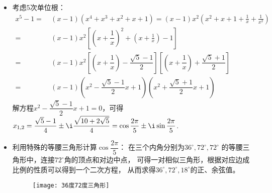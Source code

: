 \begin{itemize}[leftmargin=\inteval{\myitemleftmargin}pt,itemsep=
   \inteval{\myitemitempsep}pt,topsep=\inteval{\myitemtopsep}pt]
\item 考虑5次单位根：
\begin{align*}
    x^5-1=&\ (x-1)(x^4+x^3+x^2+x+1)=(x-1) x^2 \left(x^2+x+1+\frac{1}{x}+\frac{1}{x^2} \right)  \\
    =&\  (x-1) x^2 \left[\left( x+\dfrac{1}{x} \right)^2+ \left( x+\frac{1}{x} \right)-1  \right] \\
    =&\ (x-1) x^2\left[ \left(x+\dfrac{1}{x} \right)-\dfrac{\sqrt{5}-1}{2}  \right] 
    \left[ \left(x+\dfrac{1}{x} \right)+\dfrac{\sqrt{5}+1}{2} \right]   \\
    =&\  (x-1)\left( x^2-\dfrac{\sqrt{5}-1}{2}x+1\right) \left( x^2+\dfrac{\sqrt{5}+1}{2}x+1\right) 
\end{align*}
解方程$  x^2-\dfrac{\sqrt{5}-1}{2}x+1=0 $，可得$ x_{1,2}=\dfrac{\sqrt{5}-1}{4}
\pm \i\dfrac{\sqrt{10+2\sqrt{5}}}{4}=\cos\dfrac{2\pi}{5}\pm \i \sin \dfrac{2\pi}{5} $. 

\item 利用特殊的等腰三角形计算$ \cos\dfrac{2\pi}{5} $：
在三个内角分别为$ 36^{\circ},72^{\circ},72^{\circ}$
的等腰三角形中，连接$ 72^{\circ} $角的顶点和对边中点，
可得一对相似三角形，根据对应边成比例的性质可以得到一个二次方程，
从而求得$ 36^{\circ},72^{\circ},18^{\circ} $的正、余弦值。
\begin{figure}[h]
    \centering
    \texttt{[image: 36度72度三角形]}
\end{figure}


\end{itemize}
